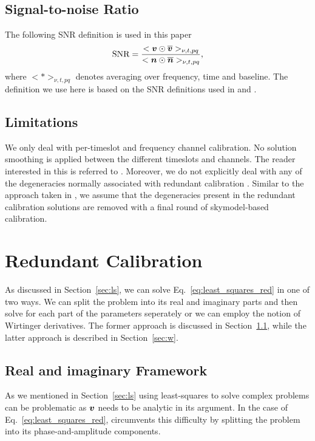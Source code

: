 \documentclass[useAMS,usenatbib]{mn2e}
\newcommand{\bv}{\bmath{v}}
\newcommand{\bn}{\bmath{n}}
\newcommand{\conj}[1]{\overline{#1}}
\begin{document}
\subsection{Signal-to-noise Ratio}
\label{sec:snr}
The following SNR definition is used in this paper  
\begin{equation}
\label{}
\textrm{SNR} = \frac{<\bv\odot\conj{\bv}>_{\nu,t,pq}}{<\bn\odot\conj{\bn}>_{\nu,t,pq}}, 
\end{equation}
where $<*>_{\nu,t,pq}$ denotes averaging over frequency, time and baseline. The definition we use here is based on the SNR definitions used in \citet{Liu2010} and \citet{Marthi2014}.

\subsection{Limitations}
\label{sec:scope}
We only deal with per-timeslot and frequency channel calibration. No solution smoothing  
is applied between the different timeslots and channels. The reader interested in this is referred to \citep{Zheng2014}. 
Moreover, we do not explicitly deal with any of the degeneracies normally associated with redundant calibration \citep{Zheng2014,Kurien2016}. Similar to the approach taken in \citep{Marthi2014}, we assume that the degeneracies present in the redundant calibration solutions are removed with a final round of skymodel-based calibration.

\section{Redundant Calibration}
\label{sec:main_sec}
As discussed in Section~\ref{sec:ls}, we can solve Eq.~\eqref{eq:least_squares_red} in one of two ways. We can split the problem into its real and
imaginary parts and then solve for each part of the parameters seperately or we can employ the notion of Wirtinger derivatives. The former 
approach is discussed in Section~\ref{sec:ri}, while the latter approach is described in Section~\ref{sec:w}. 

\subsection{Real and imaginary Framework}
\label{sec:ri}
As we mentioned in Section~\ref{sec:ls} using least-squares to solve complex problems can be problematic as $\bv$ needs to be analytic in its argument. In the case 
of Eq.~\eqref{eq:least_squares_red}, \citet{Liu2010} circumvents this difficulty by 
splitting the problem into its phase-and-amplitude components. 
\end{document}
